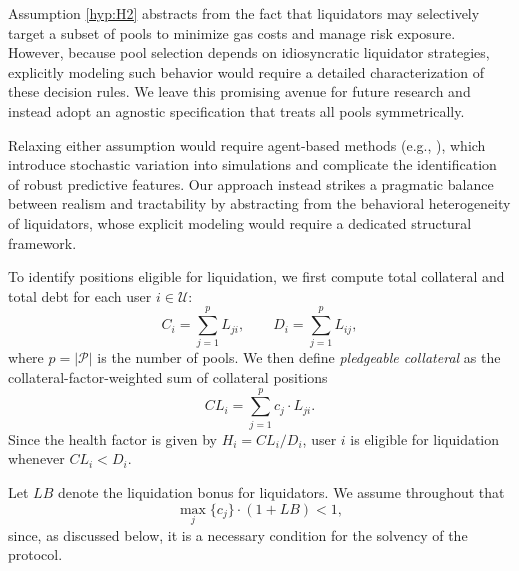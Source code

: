 \documentclass[a4paper,UKenglish,cleveref, autoref, thm-restate]{informs3}
\begin{document}
Assumption \ref{hyp:H2} abstracts from the fact that liquidators may selectively target a subset of pools to minimize gas costs and manage risk exposure. However, because pool selection depends on idiosyncratic liquidator strategies, explicitly modeling such behavior would require a detailed characterization of these decision rules. We leave this promising avenue for future research and instead adopt an agnostic specification that treats all pools symmetrically.

Relaxing either assumption would require agent-based methods (e.g., \cite{TovanichKWP23}), which introduce stochastic variation into simulations and complicate the identification of robust predictive features. Our approach instead strikes a pragmatic balance between realism and tractability by abstracting from the behavioral heterogeneity of liquidators, whose explicit modeling would require a dedicated structural framework.

To identify positions eligible for liquidation, we first compute total collateral and total debt for each user $i \in \mathcal{U}$:
\begin{equation}
\label{eq:CiDi}
C_i = \sum_{j=1}^p L_{j i}, \qquad D_i = \sum_{j=1}^p L_{i j},
\end{equation}
where $p=|\mathcal{P}|$ is the number of pools. We then define \textit{pledgeable collateral} as the collateral-factor-weighted sum of collateral positions
\begin{equation}
    CL_i = \sum_{j=1}^p c_j \cdot L_{j i}.
    \label{eq:CLi}
\end{equation}
Since the health factor is given by $H_i = CL_i / D_i$, user $i$ is eligible for liquidation whenever $CL_i < D_i$.

Let $LB$ denote the liquidation bonus for liquidators. We assume throughout that
\begin{equation}
    \label{eq:solvability_condition}
    \max_{j}\{c_j\} \cdot (1+LB) < 1,
\end{equation}
since, as discussed below, it is a necessary condition for the solvency of the protocol.
\end{document}
